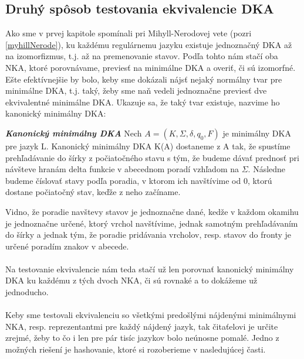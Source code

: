 \subsection{Druhý spôsob testovania ekvivalencie DKA}
Ako sme v prvej kapitole spomínali pri Mihyll-Nerodovej vete (pozri \ref{myhillNerode}), ku každému regulárnemu jazyku existuje jednoznačný DKA až na izomorfizmus, t.j. až na premenovanie stavov. Podľa tohto nám stačí oba NKA, ktoré porovnávame, previesť na minimálne DKA a overiť, či sú izomorfné. Ešte efektívnejšie by bolo, keby sme dokázali nájsť nejaký normálny tvar pre minimálne DKA, t.j. taký, žeby sme naň vedeli jednoznačne previesť dve ekvivalentné minimálne DKA. Ukazuje sa, že taký tvar existuje, nazvime ho kanonický minimálny DKA:
\\

\label{kanMinDKA}
\begin{defn}{\textbf {\textit {Kanonický minimálny DKA}}} Nech $A = (K,\Sigma,\delta,q_0,F)$ je minimálny DKA pre jazyk L. Kanonický minimálny DKA K(A) dostaneme z A tak, že spustíme prehľadávanie do šírky z počiatočného stavu s tým, že budeme dávať prednosť pri návšteve hranám delta funkcie v abecednom poradí vzhľadom na $\Sigma$. Následne budeme číslovať stavy podľa poradia, v ktorom ich navštívime od 0, ktorú dostane počiatočný stav, keďže z neho začíname.
\end{defn}
Vidno, že poradie navštevy stavov je jednoznačne dané, kedže v každom okamihu je jednoznačne určené, ktorý vrchol navštívime, jednak samotným prehľadávaním do šírky a jednak tým, že poradie pridávania vrcholov, resp. stavov do fronty je určené poradím znakov v abecede.

\paragraph{}
Na testovanie ekvivalencie nám teda stačí už len porovnať kanonický minimálny DKA ku každému z tých dvoch NKA, či sú rovnaké a to dokážeme už jednoducho.

\paragraph{}
Keby sme testovali ekvivalenciu so všetkými predošlými nájdenými minimálnymi NKA, resp. reprezentantmi pre každý nájdený jazyk, tak čitaťelovi je určite zrejmé, žeby to čo i len pre pár tisíc jazykov bolo neúnosne pomalé. Jedno z možných riešení je hashovanie, ktoré si rozoberieme v nasledujúcej časti.


